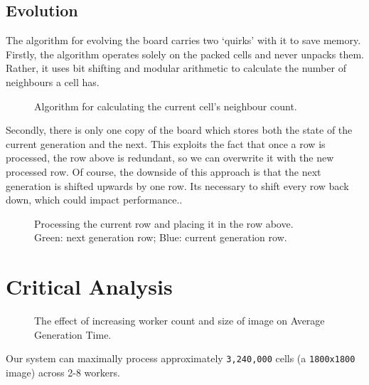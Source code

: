\documentclass{article}
\begin{document}
    \subsection{Evolution} \label{evolution}

    The algorithm for evolving the board carries two `quirks' with it to save memory. Firstly, the algorithm operates solely on the packed cells and never unpacks them. Rather, it uses bit shifting and modular arithmetic to calculate the number of neighbours a cell has. 

    \begin{figure}[h]
        
        \caption{Algorithm for calculating the current cell's neighbour count.}
        \label{fig:evolve}
    \end{figure}

    Secondly, there is only one copy of the board which stores both the state of the current generation and the next. This exploits the fact that once a row is processed, the row above is redundant, so we can overwrite it with the new processed row. Of course, the downside of this approach is that the next generation is shifted upwards by one row. Its necessary to shift every row back down, which could impact performance..

    \begin{figure}[h]
        \begin{center}
            
            
            \caption{Processing the current row and placing it in the row above. \\ Green: next generation row; Blue: current generation row.}
            \label{fig:rows}
        \end{center}
    \end{figure}

    \pagebreak

    \section{Critical Analysis} \label{analysis}

    \begin{figure}[h]
        \begin{center}
            
            \caption{The effect of increasing worker count and size of image on Average Generation Time.}
            \label{fig:agt}
        \end{center}
    \end{figure}

    Our system can maximally process approximately \verb|3,240,000| cells (a \verb|1800x1800| image) across 2-8 workers. 
\end{document}
